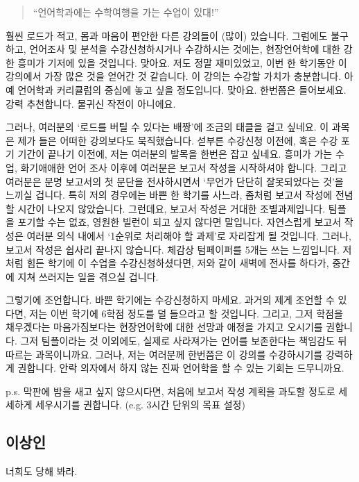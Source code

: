 \begin{quote}
    ``언어학과에는 수학여행을 가는 수업이 있대!''
\end{quote}

훨씬 로드가 적고, 몸과 마음이 편안한 다른 강의들이 (많이) 있습니다. 그럼에도 불구하고, 언어조사 및 분석을 수강신청하시거나 수강하시는 것에는, 현장언어학에 대한 강한 흥미가 기저에 있을 것입니다. 맞아요. 저도 정말 재미있었고, 이번 한 학기동안 이 강의에서 가장 많은 것을 얻어간 것 같습니다. 이 강의는 수강할 가치가 충분합니다. 아예 언어학과 커리큘럼의 중심에 놓고 싶을 정도입니다. 맞아요. 한번쯤은 들어보세요. 강력 추천합니다. 물귀신 작전이 아니에요. 

그러나, 여러분의 `로드를 버틸 수 있다는 배짱'에 조금의 태클을 걸고 싶네요. 이 과목은 제가 들은 어떠한 강의보다도 묵직했습니다. 섣부른 수강신청 이전에, 혹은 수강 포기 기간이 끝나기 이전에, 저는 여러분의 발목을 한번은 잡고 싶네요. 흥미가 가는 수업, 화기애애한 언어 조사 이후에 여러분은 보고서 작성을 시작하셔야 합니다. 그리고 여러분은 분명 보고서의 첫 문단을 전사하시면서 `무언가 단단히 잘못되었다는 것'을 느끼실 겁니다. 특히 저의 경우에는 바쁜 한 학기를 사느라, 좀처럼 보고서 작성에 전념할 시간이 나오지 않았습니다. 그런데요, 보고서 작성은 거대한 조별과제입니다. 팀플을 포기할 수는 없죠, 영원한 빌런이 되고 싶지 않다면 말입니다. 자연스럽게 보고서 작성은 여러분 의식 내에서 `1순위로 처리해야 할 과제'로 자리잡게 될 것입니다. 그러나, 보고서 작성은 쉽사리 끝나지 않습니다. 체감상 텀페이퍼를 5개는 쓰는 느낌입니다. 저처럼 힘든 학기에 이 수업을 수강신청하셨다면, 저와 같이 새벽에 전사를 하다가, 중간에 지쳐 쓰러지는 일을 겪으실 겁니다.

그렇기에 조언합니다. 바쁜 학기에는 수강신청하지 마세요. 과거의 제게 조언할 수 있다면, 저는 이번 학기에 6학점 정도를 덜 들으라고 할 것입니다. 그리고, 그저 학점을 채우겠다는 마음가짐보다는 현장언어학에 대한 선망과 애정을 가지고 오시기를 권합니다. 그저 팀플이라는 것 이외에도, 실제로 사라져가는 언어를 보존한다는 책임감도 뒤따르는 과목이니까요. 그러나, 저는 여러분께 한번쯤은 이 강의를 수강하시기를 강력하게 권합니다. 안락 의자에서 하지 않는 진짜 언어학을 할 수 있는 기회는 드무니까요.

p.s. 막판에 밤을 새고 싶지 않으시다면, 처음에 보고서 작성 계획을 과도할 정도로 세세하게 세우시기를 권합니다. (e.g. 3시간 단위의 목표 설정)

\subsection{이상인}

너희도 당해 봐라.

